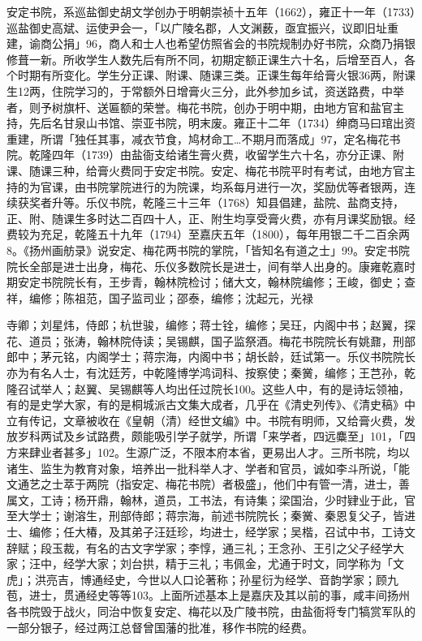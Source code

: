安定书院，系巡盐御史胡文学创办于明朝崇祯十五年（1662），雍正十一年（1733）巡盐御史高斌、运使尹会一，「以广陵名郡，人文渊薮，亟宜振兴，议即旧址重建，谕商公捐」96，商人和士人也希望仿照省会的书院规制办好书院，众商乃捐银修葺一新。所收学生人数先后有所不同，初期定额正课生六十名，后增至百人，各个时期有所变化。学生分正课、附课、随课三类。正课生每年给膏火银36两，附课生12两，住院学习的，于常额外日增膏火三分，此外参加乡试，资送路费，中举者，则予树旗杆、送匾额的荣誉。梅花书院，创办于明中期，由地方官和盐官主持，先后名甘泉山书馆、崇亚书院，明末废。雍正十二年（1734）绅商马曰琯出资重建，所谓「独任其事，减衣节食，鸠材命工…不期月而落成」97，定名梅花书院。乾隆四年（1739）由盐衙支给诸生膏火费，收留学生六十名，亦分正课、附课、随课三种，给膏火费同于安定书院。安定、梅花书院平时有考试，由地方官主持的为官课，由书院掌院进行的为院课，均系每月进行一次，奖励优等者银两，连续获奖者升等。乐仪书院，乾隆三十三年（1768）知县倡建，盐院、盐商支持，正、附、随课生多时达二百四十人，正、附生均享受膏火费，亦有月课奖励银。经费较为充足，乾隆五十九年（1794）至嘉庆五年（1800），每年用银二千二百余两8。《扬州画舫录》说安定、梅花两书院的掌院，「皆知名有道之士」99。安定书院院长全部是进士出身，梅花、乐仪多数院长是进士，间有举人出身的。康雍乾嘉时期安定书院院长有，王步青，翰林院检讨；储大文，翰林院编修；王峻，御史；查祥，编修；陈祖范，国子监司业；邵泰，编修；沈起元，光禄

\vfill
\begin{BookNotes}
\end{BookNotes}

\noindent 寺卿；刘星炜，侍郎；杭世骏，编修；蒋士铨，编修；吴玨，内阁中书；赵翼，探花、道员；张涛，翰林院侍读；吴锡麒，国子监祭酒。梅花书院院长有姚鼐，刑部郎中；茅元铭，内阁学士；蒋宗海，内阁中书；胡长龄，廷试第一。乐仪书院院长亦为有名人士，有沈廷芳，中乾隆博学鸿词科、按察使；秦黉，编修；王芑孙，乾隆召试举人；赵翼、吴锡麒等人均出任过院长100。这些人中，有的是诗坛领袖，有的是史学大家，有的是桐城派古文集大成者，几乎在《清史列传》、《清史稿》中立有传记，文章被收在《皇朝（清）经世文编》中。书院有明师，又给膏火费，发放岁科两试及乡试路费，颇能吸引学子就学，所谓「来学者，四远麋至」101，「四方来肆业者甚多」102。生源广泛，不限本府本省，更易出人才。三所书院，均以诸生、监生为教育对象，培养出一批科举人才、学者和官员，诚如李斗所说，「能文通艺之士萃于两院（指安定、梅花书院）者极盛」，他们中有管一清，进士，善属文，工诗；杨开鼎，翰林，道员，工书法，有诗集；梁国治，少时肄业于此，官至大学士；谢溶生，刑部侍郎；蒋宗海，前述书院院长；秦黉、秦恩复父子，皆进士、编修；任大椿，及其弟子汪廷珍，均进士，经学家；吴楷，召试中书，工诗文辞赋；段玉裁，有名的古文字学家；李惇，通三礼；王念孙、王引之父子经学大家；汪中，经学大家；刘台拱，精于三礼；韦佩金，尤通于时文，同学称为「文虎」；洪亮吉，博通经史，今世以人口论著称；孙星衍为经学、音韵学家；顾九苞，进士，贯通经史等等103。上面所述基本上是嘉庆及其以前的事，咸丰间扬州各书院毁于战火，同治中恢复安定、梅花以及广陵书院，由盐衙将专门犒赏军队的一部分银子，经过两江总督曾国藩的批准，移作书院的经费。

